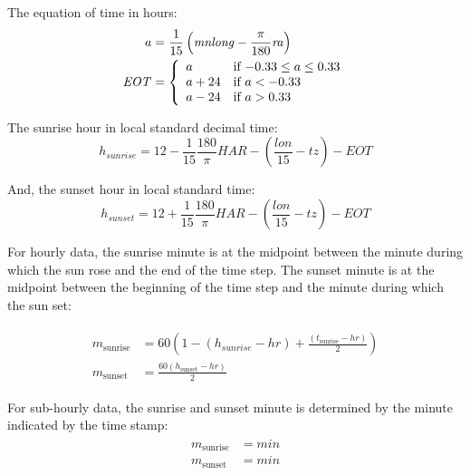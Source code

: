 \documentclass[12pt,letterpaper]{article}
\begin{document}
The equation of time in hours:
\begin{align}\label{eqn-eot}
a &= \frac{1}{15}\left(\mathit{mnlong} - \frac{\pi}{180}\mathit{ra}\right)\notag\\
\mathit{EOT} &= 
\left\{
   \begin{array}{ll}
     a & \text{if $-0.33 \leq a \leq 0.33$}\\
     a + 24 & \text{if $a<-0.33$}\\
     a - 24 & \text{if $a>0.33$}
   \end{array}
\right. 
\end{align}

The sunrise hour in local standard decimal time:
\begin{equation}
h_{sunrise} = 12 - \frac{1}{15} \frac{180}{\pi}\mathit{HAR} - \left(\frac{\mathit{lon}}{15} - \mathit{tz}\right)-\mathit{EOT}
\end{equation}

And, the sunset hour in local standard time: 
\begin{equation}
h_{sunset} = 12 + \frac{1}{15} \frac{180}{\pi}\mathit{HAR} - \left(\frac{\mathit{lon}}{15} - \mathit{tz}\right)-\mathit{EOT}
\end{equation}

For hourly data, the sunrise minute is at the midpoint between the minute during which the sun rose and the end of the time step. The sunset minute is at the midpoint between the beginning of the time step and the minute during which the sun set: 

\begin{align}
\begin{array}{ll}
\mathit{m}_\mathrm{sunrise}&=60 \left(1 - (h_{sunrise} -\mathit{hr}) + \frac{(t_{\mathrm{sunrise}} - hr)}{2}\right)\\
\mathit{m}_{\mathrm{sunset}}&=\frac{60 (h_{\mathrm{sunset}} - \mathit{hr})}{2}
\end{array}
\end{align}

For sub-hourly data, the sunrise and sunset minute is determined by the minute indicated by the time stamp:
\begin{align}
\begin{array}{ll}
\mathit{m}_\mathrm{sunrise}&=\mathit{min}\\
\mathit{m}_\mathrm{sunset}&=\mathit{min}
\end{array}
\end{align}
\end{document}
